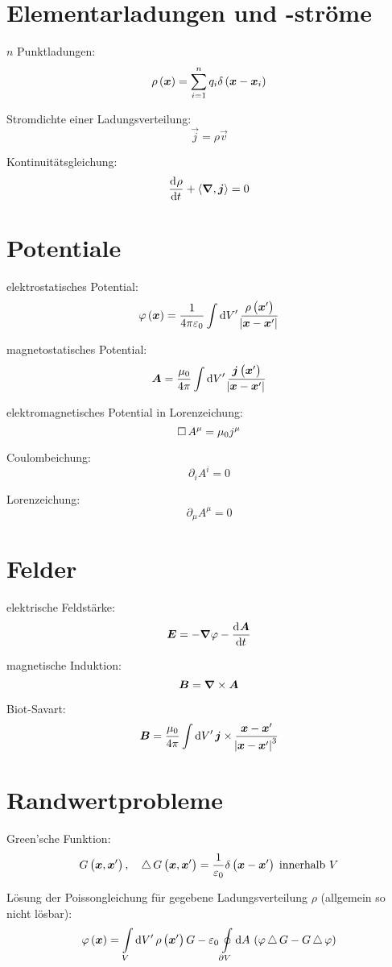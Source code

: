 \section{Elementarladungen und -ströme}

$n$ Punktladungen:
\[
	\rho\del{\vec x} = \sum_{i = 1}^n q_i \delta\del{\vec x - \vec x_i}
\]

Stromdichte einer Ladungsverteilung:
\[
	\vec j = \rho \vec v
\]

Kontinuitätsgleichung:
\[
	\dod \rho t + \divergence{\vec j} = 0
\]

\section{Potentiale}

elektrostatisches Potential:
\[
	\varphi\del{\vec x}
	= \frac{1}{4 \pi \varepsilon_0} \int \dif{V'} \,
	\frac{\rho\del{\vec x'}}{\abs{\vec x - \vec x'}}
\]

magnetostatisches Potential:
\[
	\vec A
	= \frac{\mu_0}{4 \pi} \int \dif{V'} \,
	\frac{\vec j\del{\vec x'}}{\abs{\vec x - \vec x'}}
\]

elektromagnetisches Potential in Lorenzeichung:
\[
	\operatorname{\Box} A^\mu = \mu_0 j^\mu
\]

Coulombeichung:
\[
	\partial_i A^i = 0
\]

Lorenzeichung:
\[
	\partial_\mu A^\mu = 0
\]

\section{Felder}

elektrische Feldstärke:
\[
	\vec E = - \vnabla \varphi - \dod{\vec A}t
\]

magnetische Induktion:
\[
	\boldsymbol{B} = \boldsymbol{\nabla} \times \boldsymbol{A}
\]

Biot-Savart:
\[
	\vec B = \frac{\mu_0}{4 \pi} \int \dif{V'} \, \vec j \times \frac{\vec x - \vec x'}{\abs{\vec x - \vec x'}^3}
\]

\section{Randwertprobleme}

Green'sche Funktion:
\[
	G\del{\vec x, \vec x'}
	\eqnsep
	\laplace G\del{\vec x, \vec x'}
	= \frac{1}{\varepsilon_0} \delta\del{\vec x - \vec x'} \; \text{innerhalb $V$}
\]

Lösung der Poissongleichung für gegebene Ladungsverteilung $\rho$ (allgemein so
nicht lösbar):
\[
	\varphi\del{\vec x}
	= \intop_{V} \dif{V'} \, \rho\del{\vec x'} G
	- \varepsilon_0 \ointop_{\partial V} \dif A \,
	\del{\varphi \laplace G - G \laplace \varphi}
\]

